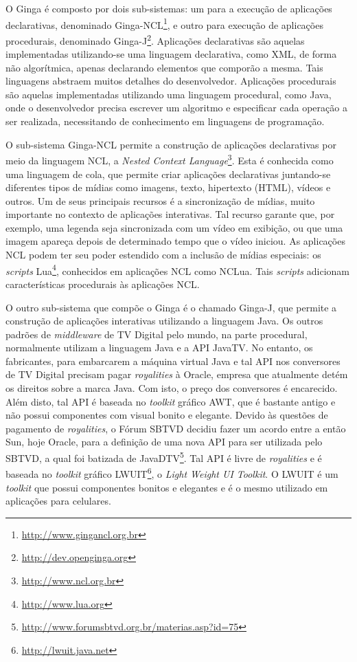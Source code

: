 O Ginga é composto por dois sub-sistemas: um para a execução de aplicações declarativas, denominado
Ginga-NCL\footnote{\url{http://www.gingancl.org.br}}, e outro para execução de aplicações procedurais, 
denominado Ginga-J\footnote{\url{http://dev.openginga.org}}.
Aplicações declarativas são aquelas implementadas utilizando-se uma linguagem declarativa, como
XML, de forma não algorítmica, apenas declarando elementos que comporão a mesma.
Tais linguagens abstraem muitos detalhes do desenvolvedor. 
Aplicações procedurais são aquelas implementadas utilizando uma linguagem procedural, como Java,
onde o desenvolvedor precisa escrever um algoritmo e especificar cada operação a ser realizada,
necessitando de conhecimento em linguagens de programação.

O sub-sistema Ginga-NCL permite a construção de aplicações declarativas por meio da linguagem NCL,
a \textit{Nested Context Language}\footnote{\url{http://www.ncl.org.br}}. 
Esta é conhecida como uma linguagem de cola, que permite criar aplicações declarativas
juntando-se diferentes tipos de mídias como imagens, texto, hipertexto (HTML), vídeos
e outros. Um de seus principais recursos é a sincronização de mídias, muito
importante no contexto de aplicações interativas. Tal recurso garante que, por exemplo,
uma legenda seja sincronizada com um vídeo em exibição, ou que uma imagem
apareça depois de determinado tempo que o vídeo iniciou.
As aplicações NCL podem ter seu poder estendido com a inclusão de mídias especiais:
os \textit{scripts} Lua\footnote{\url{http://www.lua.org}}, conhecidos em aplicações NCL como NCLua. Tais \textit{scripts}
adicionam características procedurais às aplicações NCL.

O outro sub-sistema que compõe o Ginga é o chamado Ginga-J, que permite a construção
de aplicações interativas utilizando a linguagem Java. Os outros padrões de \textit{middleware}
de TV Digital pelo mundo, na parte procedural, normalmente utilizam a linguagem Java e a API JavaTV.
No entanto, os fabricantes, para embarcarem a máquina virtual Java
e tal API nos conversores de TV Digital precisam pagar \textit{royalities} 
à Oracle, empresa que atualmente detém os direitos sobre a marca Java.
Com isto, o preço dos conversores é encarecido. Além disto, 
tal API é baseada no \textit{toolkit} gráfico AWT, que é bastante
antigo e não possui componentes com visual bonito e elegante.
Devido às questões de pagamento de \textit{royalities}, o Fórum SBTVD
decidiu fazer um acordo entre a então Sun, hoje Oracle, para 
a definição de uma nova API para ser utilizada pelo SBTVD, a qual
foi batizada de JavaDTV\footnote{\url{http://www.forumsbtvd.org.br/materias.asp?id=75}}. Tal API é livre de \textit{royalities} 
e é baseada no \textit{toolkit} gráfico LWUIT\footnote{\url{http://lwuit.java.net}}, o \textit{Light Weight UI Toolkit}.
O LWUIT é um \textit{toolkit} que possui componentes bonitos e elegantes
e é o mesmo utilizado em aplicações para celulares.

